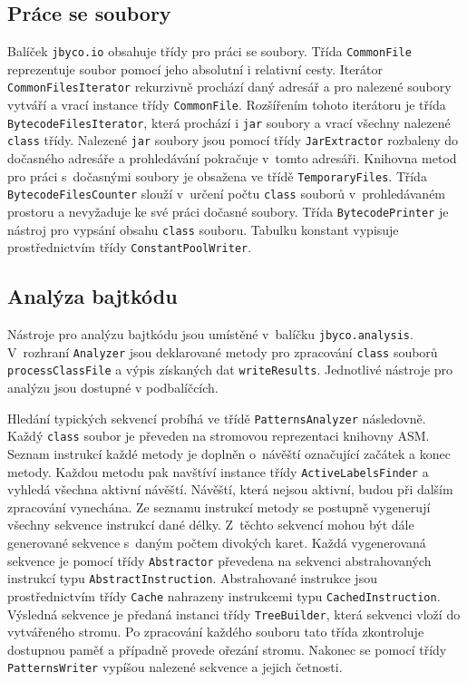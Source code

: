 \subsection{Práce se soubory}

Balíček \texttt{jbyco.io} obsahuje třídy pro práci se soubory. Třída \texttt{CommonFile} reprezentuje soubor pomocí jeho absolutní i relativní cesty. Iterátor \texttt{CommonFilesIterator} rekurzivně prochází daný adresář a pro nalezené soubory vytváří a vrací instance třídy \texttt{CommonFile}. Rozšířením tohoto iterátoru je třída \texttt{BytecodeFilesIterator}, která prochází i \texttt{jar} soubory a vrací všechny nalezené \texttt{class} třídy. Nalezené \texttt{jar} soubory jsou pomocí třídy \texttt{JarExtractor} rozbaleny do dočasného adresáře a prohledávání pokračuje v~tomto adresáři. Knihovna metod pro práci s~dočasnými soubory je obsažena ve třídě \texttt{TemporaryFiles}. Třída \texttt{BytecodeFilesCounter} slouží v~určení počtu \texttt{class} souborů v~prohledávaném prostoru a nevyžaduje ke své práci dočasné soubory. 
Třída \texttt{BytecodePrinter} je nástroj pro vypsání obsahu \texttt{class} souboru. Tabulku konstant vypisuje prostřednictvím třídy \texttt{ConstantPoolWriter}.  

\subsection{Analýza bajtkódu}

Nástroje pro analýzu bajtkódu jsou umístěné v~balíčku \texttt{jbyco.analysis}. V~rozhraní \texttt{Analyzer} jsou deklarované metody pro zpracování \texttt{class} souborů \texttt{processClassFile} a výpis získaných dat \texttt{writeResults}. Jednotlivé nástroje pro analýzu jsou dostupné v podbalíčcích.

Hledání typických sekvencí probíhá ve třídě \texttt{PatternsAnalyzer} následovně. Každý \texttt{class} soubor je převeden na stromovou reprezentaci knihovny ASM. Seznam instrukcí každé metody je doplněn o~návěští označující začátek a konec metody. Každou metodu pak navštíví instance třídy \texttt{ActiveLabelsFinder} a vyhledá všechna aktivní návěští. Návěští, která nejsou aktivní, budou při dalším zpracování vynechána. Ze seznamu instrukcí metody se postupně vygenerují všechny sekvence instrukcí dané délky. Z~těchto sekvencí mohou být dále generované sekvence s~daným počtem divokých karet. Každá vygenerovaná sekvence je pomocí třídy \texttt{Abstractor} převedena na sekvenci abstrahovaných instrukcí typu \texttt{AbstractInstruction}. Abstrahované instrukce jsou prostřednictvím třídy \texttt{Cache} nahrazeny instrukcemi typu \texttt{CachedInstruction}. Výsledná sekvence je předaná instanci třídy \texttt{TreeBuilder}, která sekvenci vloží do vytvářeného stromu. Po zpracování každého souboru tato třída zkontroluje dostupnou paměť a případně provede ořezání stromu. Nakonec se pomocí třídy \texttt{PatternsWriter} vypíšou nalezené sekvence a jejich četnosti.


